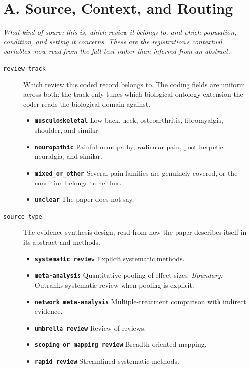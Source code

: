 \documentclass[11pt]{article}
\begin{document}
\section*{A. Source, Context, and Routing}
{\small\itshape What kind of source this is, which review it belongs to, and which population, condition, and setting it concerns. These are the registration's contextual variables, now read from the full text rather than inferred from an abstract.}\par\smallskip
\begin{description}
\item[\texttt{review\_track}] Which review this coded record belongs to. The coding fields are uniform across both; the track only tunes which biological ontology extension the coder reads the biological domain against.
  \begin{itemize}[leftmargin=1.3em,itemsep=2pt,topsep=2pt]
  \item \textbf{\texttt{musculoskeletal}} Low back, neck, osteoarthritis, fibromyalgia, shoulder, and similar.
  \item \textbf{\texttt{neuropathic}} Painful neuropathy, radicular pain, post-herpetic neuralgia, and similar.
  \item \textbf{\texttt{mixed\_or\_other}} Several pain families are genuinely covered, or the condition belongs to neither.
  \item \textbf{\texttt{unclear}} The paper does not say.
  \end{itemize}
\item[\texttt{source\_type}] The evidence-synthesis design, read from how the paper describes itself in its abstract and methods.
  \begin{itemize}[leftmargin=1.3em,itemsep=2pt,topsep=2pt]
  \item \textbf{\texttt{systematic review}} Explicit systematic methods.
  \item \textbf{\texttt{meta-analysis}} Quantitative pooling of effect sizes. {\small \textit{Boundary:} Outranks systematic review when pooling is explicit.}
  \item \textbf{\texttt{network meta-analysis}} Multiple-treatment comparison with indirect evidence.
  \item \textbf{\texttt{umbrella review}} Review of reviews.
  \item \textbf{\texttt{scoping or mapping review}} Breadth-oriented mapping.
  \item \textbf{\texttt{rapid review}} Streamlined systematic methods.

\end{itemize}
\end{description}
\end{document}
